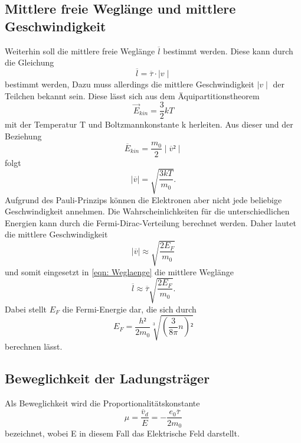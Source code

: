 \subsection{Mittlere freie Weglänge und mittlere Geschwindigkeit}
    Weiterhin soll die mittlere freie Weglänge $\overline l$ bestimmt werden. Diese 
    kann durch die Gleichung
    \begin{equation}
        \label{eqn: Weglaenge}
        \overline l = \overline \tau \cdot \mid v \mid
    \end{equation}
    bestimmt werden, Dazu muss allerdings die mittlere Geschwindigkeit $\mid v \mid$ der Teilchen
    bekannt sein. Diese lässt sich aus dem Äquipartitionstheorem 
    \begin{equation}
        \vec E_{kin}=\dfrac{3}{2} k T
    \end{equation}
    mit der Temperatur T und Boltzmannkonstante k herleiten. Aus dieser und der Beziehung
    \begin{equation*}
        \overline E_{kin} = \dfrac{m_0}{2}\mid \overline v² \mid
    \end{equation*}
    folgt
    \begin{equation}
        \mid \overline v \mid = \sqrt{\dfrac{3kT}{m_0}}.
    \end{equation}
    Aufgrund des Pauli-Prinzips können die Elektronen aber nicht jede beliebige Geschwindigkeit 
    annehmen. Die Wahrscheinlichkeiten für die unterschiedlichen Energien kann durch die
    Fermi-Dirac-Verteilung berechnet werden. Daher lautet die mittlere Geschwindigkeit
    \begin{equation}
        \label{eqn:totv}
        \mid \overline v \mid \approx \sqrt{\dfrac{2 E_F}{m_0}}
    \end{equation}
    und somit eingesetzt in \eqref{eqn: Weglaenge} die mittlere Weglänge
    \begin{equation}
        \overline l \approx \overline \tau \sqrt{\dfrac{2 E_F}{m_0}}.
    \end{equation}
    Dabei stellt $E_F$ die Fermi-Energie dar, die sich durch
    \begin{equation}
        \label{eqn:fermi}
        E_F = \dfrac{h²}{2 m_0}\sqrt[3]{(\dfrac{3}{8\pi }n)²}
    \end{equation}
    berechnen lässt.
\subsection{Beweglichkeit der Ladungsträger}
    Als Beweglichkeit wird die Proportionalitätskonstante 
    \begin{equation}
        \label{eqn:beweg}
        \mu = \dfrac{\overline v_d}{E} = - \dfrac{e_0 \overline \tau}{2 m_0}
    \end{equation}
    bezeichnet, wobei E in diesem Fall das Elektrische Feld darstellt.
